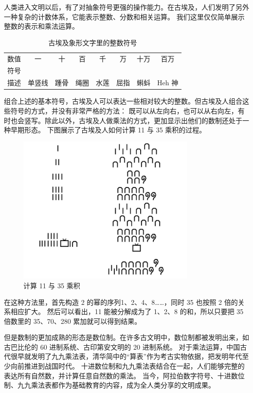 \documentclass[a4paper,10.5pt]{book}
\begin{document}
人类进入文明以后，有了对抽象符号更强的操作能力。在古埃及，人们发明了另外一种复杂的计数体系，它能表示整数、分数和相关运算。
我们这里仅仅简单展示整数的表示和乘法运算。

\begin{table}[tbhp]
\centering
\begin{tabular}{|c|ccccccc|}
\hline
数值 & 一 & 十 & 百 & 千 & 万 & 十万 & 百万 \\
符号 & \pmglyph{\Hone} & \pmglyph{\Hten} & \pmglyph{\Hhundred} & \pmglyph{\Hthousand} & \pmglyph{\HXthousand} & \pmglyph{\HCthousand} & \pmglyph{\Hmillion} \\
描述 & 单竖线 & 踵骨 & 绳圈 & 水莲 & 屈指 & 蝌蚪 & Heh 神\\
\hline
\end{tabular}
\caption{古埃及象形文字里的整数符号}
\end{table}

组合上述的基本符号，古埃及人可以表达一些相对较大的整数。但古埃及人组合这些符号的方式，并没有非常严格的方法：
既可以从左向右，也可以从右向左，有时也会竖写。除此以外，古埃及人做乘法的方式，更加显示出他们的数制还处于一种早期形态。
下图展示了古埃及人如何计算 11 与 35 乘积的过程。

\begin{figure}[ht]
\centering
\includegraphics[width=3.5in]{images/ancient_egypt_multiplication.jpg}
\caption{计算 11 与 35 乘积}
\end{figure}

在这种方法里，首先构造 2 的幂的序列1、2、4、8……，同时 35 也按照 2 倍的关系相应扩大。
然后可以看出，11 能被分解成为了 1、2、8 的和，所以只要把 35 倍数里的 35、70、280 累加就可以得到结果。

但是数制的更加成熟的形态是数位制。在许多古文明中，数位制都被发明出来，如古巴比伦的 60 进制系统、古印第安文明的 20 进制系统。
对于乘法运算，中国古代很早就发明了九九乘法表，清华简中的“算表”作为考古实物依据，把发明年代至少向前推进到战国时代。
十进数位制和九九乘法表结合在一起，人们能够完整的表达所有自然数，并计算任意自然数的乘法。
当今，阿拉伯数字符号、十进数位制、九九乘法表都作为基础教育的内容，成为全人类分享的文明成果。
\end{document}
